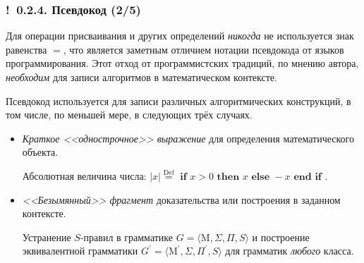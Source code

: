 \documentclass[mathserif,12pt,aspectratio=169]{beamer}
\def\emразделенной{\em разделенной}
\def\em#1{\it\color{blue}#1}
\def\Assign{\operatorname{:=}}
\def\Def{\stackrel{\text{Def}}{=}}
\def\Ok{{\color{green}\textbf{!}\ }}
\begin{document}
\begin{frame}
\frametitle{\Ok 0.2.4. Псевдокод (2/5)}

\vspace{-1pt}
\begin{remark}
Для операции присваивания и других определений
{\em никогда} не используется знак равенства $=$, 
что является заметным отличием нотации 
псевдокода от языков программирования.
Этот отход от программистских традиций, по мнению автора, {\em необходим}
для записи алгоритмов в математическом контексте.  
\end{remark}

Псевдокод используется для записи различных алгоритмических конструкций, в том числе, по меньшей мере, в следующих трёх случаях.
\begin{itemize}
\item {\em Краткое <<однострочное>>  выражение} для 
определения математического объекта.
\begin{example} Абсолютная величина числа: 
$|x|\Def \textbf{ if } x>0 \textbf{ then } x \textbf{ else } -x \textbf{ end if }$.
\end{example}
\item {\em <<Безымянный>> фрагмент } доказательства или построения в заданном контексте. 
\begin{example}
Устранение $S$-правил в грамматике 
$G=\langle\mathrm{M},\Sigma,\Pi, S\rangle$ и построение эквивалентной грамматики
$G^\prime=\langle\mathrm{M}^\prime,\Sigma,\Pi^\prime, S\rangle$ для
грамматик {\em любого} класса.

\vspace{-1pt}
\begin{algorithmic}
\STATE {$\mathrm{M}^\prime\Assign\mathrm{M}+S^\prime$}
\FOR{$(\alpha\to\beta)\in\Pi$}
\STATE {$ (\alpha\to\beta)\Assign(\alpha[S^\prime/S]\to\beta[S^\prime/S])$}
\ENDFOR
\STATE {$\Pi^\prime\Assign\Pi+(S\to S^\prime)$}
\end{algorithmic}
\end{example}
\end{itemize}
\end{frame}
\end{document}
